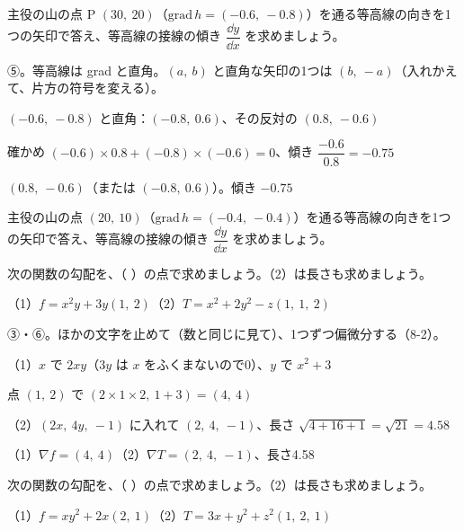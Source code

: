 \begin{reidai}[等高線の向き]
主役の山の点 P $(30,\ 20)$（$\mathrm{grad}\,h=(-0.6,\ -0.8)$）を通る等高線の向きを1つの矢印で答え、等高線の接線の傾き $\dfrac{\dd y}{\dd x}$ を求めましょう。\par
\kangaekata ⑤。等高線は grad と直角。$(a,\ b)$ と直角な矢印の1つは $(b,\ -a)$（入れかえて、片方の符号を変える）。\par
\shiki\kviiies{}\zw{} $(-0.6,\ -0.8)$ と直角：$(-0.8,\ 0.6)$、その反対の $(0.8,\ -0.6)$\par
\kviiiea 確かめ $(-0.6)\times0.8+(-0.8)\times(-0.6)=0$、傾き $\dfrac{-0.6}{0.8}=-0.75$\par
\kotae\kviiies{}\zw{} $(0.8,\ -0.6)$（または $(-0.8,\ 0.6)$）。傾き $-0.75$
\end{reidai}

\begin{jibun}
主役の山の点 $(20,\ 10)$（$\mathrm{grad}\,h=(-0.4,\ -0.4)$）を通る等高線の向きを1つの矢印で答え、等高線の接線の傾き $\dfrac{\dd y}{\dd x}$ を求めましょう。
\end{jibun}

\begin{reidai}
次の関数の勾配を、（ ）の点で求めましょう。（2）は長さも求めましょう。\par
（1）$f=x^2y+3y$\quad $(1,\ 2)$\qquad（2）$T=x^2+2y^2-z$\quad $(1,\ 1,\ 2)$\par
\kangaekata ③・⑥。ほかの文字を止めて（数と同じに見て）、1つずつ偏微分する（8-2）。\par
\shiki\kviiies{}\zw{} （1）$x$ で $2xy$（$3y$ は $x$ をふくまないので0）、$y$ で $x^2+3$\par
\kviiieb 点 $(1,\ 2)$ で $(2\times1\times2,\ 1+3)=(4,\ 4)$\par
\kviiiea （2）$(2x,\ 4y,\ -1)$ に入れて $(2,\ 4,\ -1)$、長さ $\sqrt{4+16+1}=\sqrt{21}=4.58$\par
\kotae\kviiies{}\zw{} （1）$\nabla f=(4,\ 4)$\quad （2）$\nabla T=(2,\ 4,\ -1)$、長さ4.58
\end{reidai}

\begin{jibun}
次の関数の勾配を、（ ）の点で求めましょう。（2）は長さも求めましょう。\par
（1）$f=xy^2+2x$\quad $(2,\ 1)$\qquad（2）$T=3x+y^2+z^2$\quad $(1,\ 2,\ 1)$
\end{jibun}

